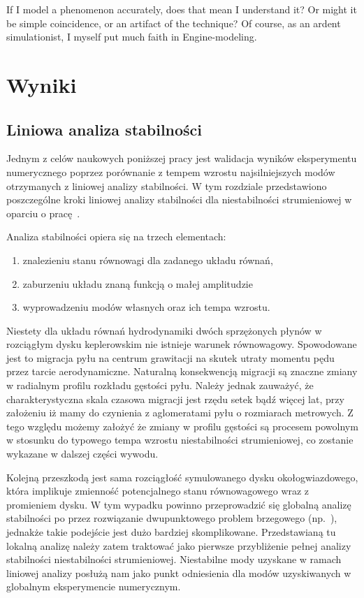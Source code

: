 \begin{savequote}[75mm]
   If I model a phenomenon accurately, does that mean I understand it? Or might it be simple coincidence, or an artifact
   of the technique? Of course, as an ardent simulationist, I myself put much faith in Engine-modeling.
\end{savequote}

\chapter{Wyniki}

\section{Liniowa analiza stabilności}
\label{sec:lsa}
Jednym z celów naukowych poniższej pracy jest walidacja wyników eksperymentu
numerycznego poprzez porównanie z tempem wzrostu najsilniejszych modów
otrzymanych z liniowej analizy stabilności. W tym rozdziale przedstawiono
poszczególne kroki liniowej analizy stabilności dla niestabilności strumieniowej
w oparciu o pracę~\citep{YG05}.

Analiza stabilności opiera się na trzech elementach:
\begin{enumerate}
   \item znalezieniu stanu równowagi dla zadanego układu równań,
   \item zaburzeniu układu znaną funkcją o małej amplitudzie 
   \item wyprowadzeniu modów własnych oraz ich tempa wzrostu.
\end{enumerate}
Niestety dla układu równań hydrodynamiki dwóch sprzężonych płynów w rozciągłym
dysku keplerowskim nie istnieje warunek równowagowy. Spowodowane jest to
migracja pyłu na centrum grawitacji na skutek utraty momentu pędu przez tarcie
aerodynamiczne. Naturalną konsekwencją migracji są znaczne zmiany w radialnym
profilu rozkładu gęstości pyłu. Należy jednak zauważyć, że charakterystyczna
skala czasowa migracji jest rzędu setek bądź więcej lat, przy założeniu iż mamy
do czynienia z aglomeratami pyłu o rozmiarach metrowych. Z tego względu możemy
założyć że zmiany w profilu gęstości są procesem powolnym w stosunku do typowego
tempa wzrostu niestabilności strumieniowej, co zostanie wykazane w dalszej
części wywodu.

Kolejną przeszkodą jest sama rozciągłość symulowanego dysku okołogwiazdowego,
która implikuje zmienność potencjalnego stanu równowagowego wraz z promieniem
dysku. W tym wypadku powinno przeprowadzić się globalną analizę stabilności po
przez rozwiązanie dwupunktowego problem brzegowego (np.~\cite{PHM04, KH06}),
jednakże takie podejście jest dużo bardziej skomplikowane. Przedstawianą tu
lokalną analizę należy zatem traktować jako pierwsze przybliżenie pełnej analizy
stabilności niestabilności strumieniowej. Niestabilne mody uzyskane w ramach
liniowej analizy posłużą nam jako punkt odniesienia dla modów uzyskiwanych w
globalnym eksperymencie numerycznym.

